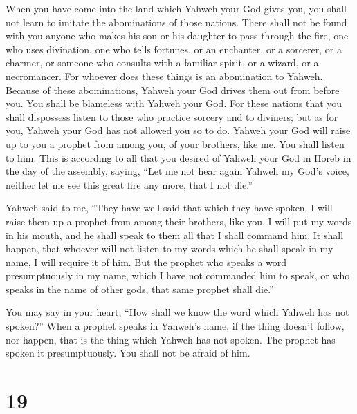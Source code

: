 When you have come into the land which Yahweh your God
gives you, you shall not learn to imitate the abominations of those
nations.  There shall not be found with you anyone who
makes his son or his daughter to pass through the fire, one who uses
divination, one who tells fortunes, or an enchanter, or a sorcerer,
 or a charmer, or someone who consults with a familiar
spirit, or a wizard, or a necromancer.  For whoever does
these things is an abomination to Yahweh. Because of these abominations,
Yahweh your God drives them out from before you.  You
shall be blameless with Yahweh your God.  For these
nations that you shall dispossess listen to those who practice sorcery
and to diviners; but as for you, Yahweh your God has not allowed you so
to do.  Yahweh your God will raise up to you a prophet
from among you, of your brothers, like me. You shall listen to him.
 This is according to all that you desired of Yahweh your
God in Horeb in the day of the assembly, saying, ``Let me not hear again
Yahweh my God's voice, neither let me see this great fire any more, that
I not die.''

 Yahweh said to me, ``They have well said that which they
have spoken.  I will raise them up a prophet from among
their brothers, like you. I will put my words in his mouth, and he shall
speak to them all that I shall command him.  It shall
happen, that whoever will not listen to my words which he shall speak in
my name, I will require it of him.  But the prophet who
speaks a word presumptuously in my name, which I have not commanded him
to speak, or who speaks in the name of other gods, that same prophet
shall die.''

 You may say in your heart, ``How shall we know the word
which Yahweh has not spoken?''  When a prophet speaks in
Yahweh's name, if the thing doesn't follow, nor happen, that is the
thing which Yahweh has not spoken. The prophet has spoken it
presumptuously. You shall not be afraid of him.

\hypertarget{section-18}{%
\section{19}\label{section-18}}


